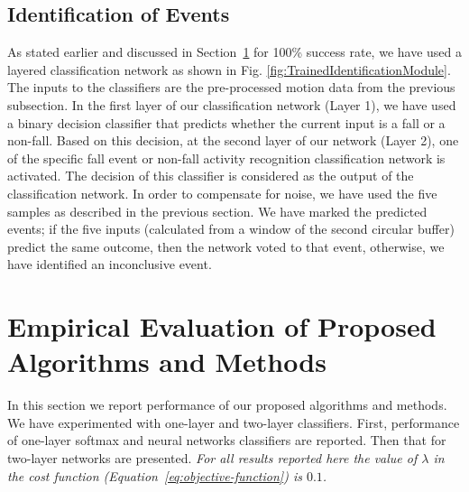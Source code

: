 \documentclass{IEEEtran}
\begin{document}
\subsection{Identification of Events}

As stated earlier and discussed in Section~\ref{Evaluation} for 100\% success rate, we have used a layered classification network as 
shown in Fig. \ref{fig:TrainedIdentificationModule}. The inputs to the classifiers are 
the 
pre-processed motion data from the previous subsection. In the first layer of our 
classification network (Layer 1), we have used a binary decision classifier that predicts 
whether the current input is a fall or a non-fall. Based on this decision, at the second 
layer of our network (Layer 2), one of the specific fall event or non-fall activity 
recognition classification network is activated. The decision of this classifier is 
considered as the output of the classification network. In order to compensate for noise, 
we have used the five samples as described in the previous section. We have marked the 
predicted events; if the five inputs (calculated from a window of the second circular 
buffer) 
predict the same outcome, then the network voted 
to that event, otherwise, we have identified an inconclusive event. 



\section{Empirical Evaluation of Proposed Algorithms and Methods}
\label{Evaluation}

In this section we report performance of our proposed algorithms and methods. 
We have experimented with one-layer and two-layer classifiers.  First, performance of one-layer softmax and neural networks classifiers are reported. Then that for two-layer networks are presented. 
\emph{For all results reported here the value of $\lambda$ in the cost function 
(Equation~\ref{eq:objective-function}) is $0.1$.}
\end{document}
